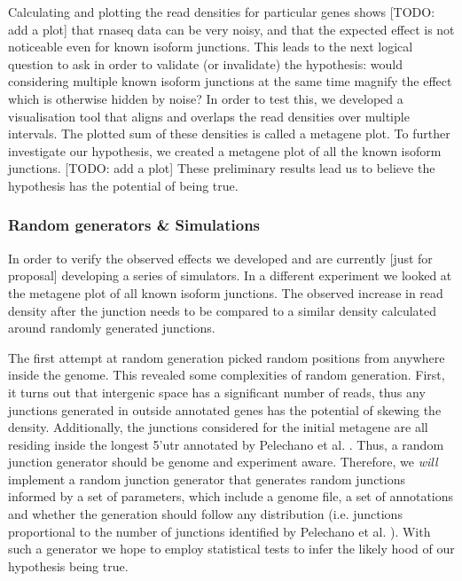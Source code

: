 \documentclass[12pt]{article}
\begin{document}
Calculating and plotting the read densities for particular genes shows {\tiny [TODO: add a plot]} that \acrshort{rnaseq} data can be very noisy, and that the expected effect is not noticeable even for known isoform junctions. This leads to the next logical question to ask in order to validate (or invalidate) the hypothesis: would considering multiple known isoform junctions at the same time magnify the effect which is otherwise hidden by noise? In order to test this, we developed a visualisation tool that aligns and overlaps the read densities over multiple intervals. The plotted sum of these densities is called a metagene plot. To further investigate our hypothesis, we created a metagene plot of all the known isoform junctions. {\tiny [TODO: add a plot]} These preliminary results lead us to believe the hypothesis has the potential of being true. 

\subsubsection{Random generators \& Simulations}\label{rng}
In order to verify the observed effects we developed and are currently {\tiny [just for proposal]} developing a series of simulators. In a different experiment we looked at the metagene plot of all known isoform junctions. The observed increase in read density after the junction needs to be compared to a similar density calculated around randomly generated junctions.

The first attempt at random generation picked random positions from anywhere inside the genome. This revealed some complexities of random generation. First, it turns out that intergenic space has a significant number of reads, thus any junctions generated in outside annotated genes has the potential of skewing the density. Additionally, the junctions considered for the initial metagene are all residing inside the longest 5'\acrshort{utr} annotated by Pelechano et al. \cite{Pelechano2013}. Thus, a random junction generator should be genome and experiment aware. Therefore, we \textit{will} implement a random junction generator that generates random junctions informed by a set of parameters, which include a genome file, a set of annotations and whether the 
generation should follow any distribution (i.e. junctions proportional to the number of junctions identified by Pelechano et al. \cite{Pelechano2013}). With such a generator we hope to employ statistical tests to infer the likely hood of our hypothesis being true. 
\end{document}
